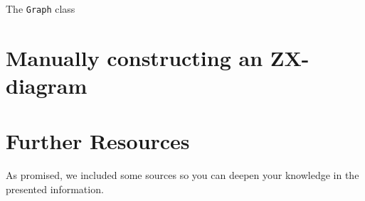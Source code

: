 The \texttt{Graph} class

\section{Manually constructing an ZX-diagram}

\section{Further Resources}
As promised, we included some sources so you can deepen your knowledge in the presented information. 
